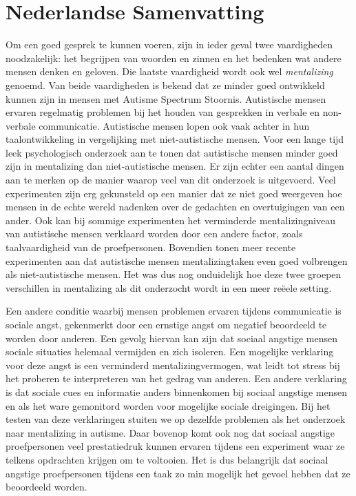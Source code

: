 \chapter*{Nederlandse Samenvatting}
\label{ch:nederlandsesamenvatting}


Om een goed gesprek te kunnen voeren, zijn in ieder geval twee vaardigheden noodzakelijk: het begrijpen van woorden en zinnen en het bedenken wat andere mensen denken en geloven. Die laatste vaardigheid wordt ook wel \emph{mentalizing} genoemd. Van beide vaardigheden is bekend dat ze minder goed ontwikkeld kunnen zijn in mensen met Autisme Spectrum Stoornis. Autistische mensen ervaren regelmatig problemen bij het houden van gesprekken in verbale en non-verbale communicatie. Autistische mensen lopen ook vaak achter in hun taalontwikkeling in vergelijking met niet-autistische mensen. Voor een lange tijd leek psychologisch onderzoek aan te tonen dat autistische mensen minder goed zijn in mentalizing dan niet-autistische mensen. Er zijn echter een aantal dingen aan te merken op de manier waarop veel van dit onderzoek is uitgevoerd. Veel experimenten zijn erg gekunsteld op een manier dat ze niet goed weergeven hoe mensen in de echte wereld nadenken over de gedachten en overtuigingen van een ander. Ook kan bij sommige experimenten het verminderde mentalizingniveau van autistische mensen verklaard worden door een andere factor, zoals taalvaardigheid van de proefpersonen. Bovendien tonen meer recente experimenten aan dat autistische mensen mentalizingtaken even goed volbrengen als niet-autistische mensen. Het was dus nog onduidelijk hoe deze twee groepen verschillen in mentalizing als dit onderzocht wordt in een meer re\"eele setting.

Een andere conditie waarbij mensen problemen ervaren tijdens communicatie is sociale angst, gekenmerkt door een ernstige angst om negatief beoordeeld te worden door anderen. Een gevolg hiervan kan zijn dat sociaal angstige mensen sociale situaties helemaal vermijden en zich isoleren. Een mogelijke verklaring voor deze angst is een verminderd mentalizingvermogen, wat leidt tot stress bij het proberen te interpreteren van het gedrag van anderen. Een andere verklaring is dat sociale cues en informatie anders binnenkomen bij sociaal angstige mensen en als het ware gemonitord worden voor mogelijke sociale dreigingen. Bij het testen van deze verklaringen stuiten we op dezelfde problemen als het onderzoek naar mentalizing in autisme. Daar bovenop komt ook nog dat sociaal angstige proefpersonen veel prestatiedruk kunnen ervaren tijdens een experiment waar ze telkens opdrachten krijgen om te voltooien. Het is dus belangrijk dat sociaal angstige proefpersonen tijdens een taak zo min mogelijk het gevoel hebben dat ze beoordeeld worden.

